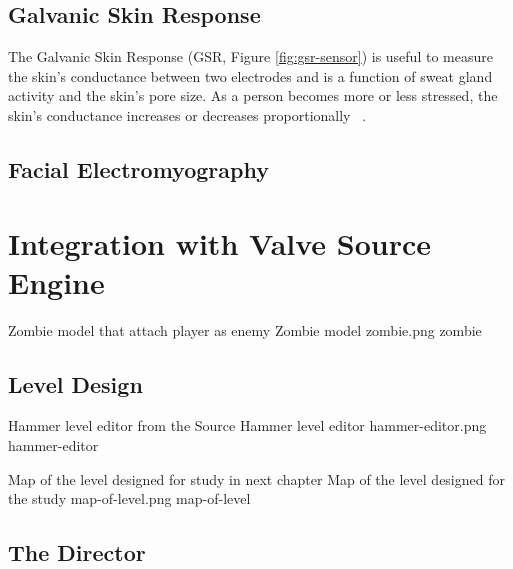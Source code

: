 \subsection{Galvanic Skin Response}
The Galvanic Skin Response (GSR, Figure \ref{fig:gsr-sensor}) is useful to measure the skin's conductance between two electrodes and is a function of sweat gland activity and the skin's pore size. As a person becomes more or less stressed, the skin's conductance increases or decreases proportionally ~\cite{picard2003affective}.

\subsection{Facial Electromyography}


\section{Integration with Valve Source Engine}

\img
{Zombie model that attach player as enemy}
{Zombie model}
{zombie.png}
{zombie}

\subsection{Level Design}

\largeimg
{Hammer level editor from the Source}
{Hammer level editor}
{hammer-editor.png}
{hammer-editor}

\largeimg
{Map of the level designed for study in next chapter}
{Map of the level designed for the study}
{map-of-level.png}
{map-of-level}


\subsection{The Director}

